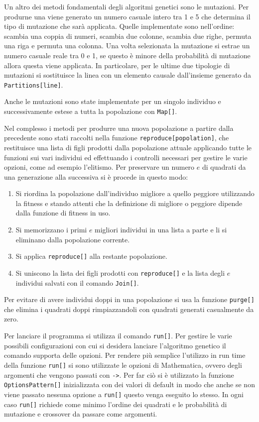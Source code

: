 \documentclass[italian,twoside,twocolumn]{article}
\begin{document}
Un altro dei metodi fondamentali degli algoritmi genetici sono le mutazioni. Per produrne una viene generato un numero casuale intero tra 1 e 5 che determina il tipo di mutazione che sarà applicata. Quelle implementate sono nell'ordine: scambia una coppia di numeri, scambia due colonne, scambia due righe, permuta una riga e permuta una colonna. Una volta selezionata la mutazione si estrae un numero casuale reale tra 0 e 1, se questo è minore della probabilità di mutazione allora questa viene applicata. In particolare, per le ultime due tipologie di mutazioni si sostituisce la linea con un elemento causale dall'insieme generato da \texttt{Partitions[line]}.

Anche le mutazioni sono state implementate per un singolo individuo e successivamente estese a tutta la popolazione con \texttt{Map[]}.

Nel complesso i metodi per produrre una nuova popolazione a partire dalla precedente sono stati raccolti nella funzione \texttt{reproduce[popolation]}, che restituisce una lista di figli prodotti dalla popolazione attuale applicando tutte le funzioni sui vari individui ed effettuando i controlli necessari per gestire le varie opzioni, come ad esempio l'elitismo. Per preservare un numero $ e $ di quadrati da una generazione alla successiva si è procede in questo modo:
\begin{enumerate}
	\item Si riordina la popolazione dall'individuo migliore a quello peggiore utilizzando la fitness e stando attenti che la definizione di migliore o peggiore dipende dalla funzione di fitness in uso.
	\item Si memorizzano i primi $ e $ migliori individui in una lista a parte e li si eliminano dalla popolazione corrente.
	\item Si applica \texttt{reproduce[]} alla restante popolazione.
	\item Si uniscono la lista dei figli prodotti con \texttt{reproduce[]} e la lista degli $ e $ individui salvati con il comando \texttt{Join[]}.
\end{enumerate}
Per evitare di avere individui doppi in una popolazione si usa la funzione \texttt{purge[]} che elimina i quadrati doppi rimpiazzandoli con quadrati generati casualmente da zero.

Per lanciare il programma si utilizza il comando \texttt{run[]}. Per gestire le varie possibili configurazioni con cui si desidera lanciare l'algoritmo genetico il comando supporta delle opzioni. Per rendere più semplice l'utilizzo in run time della funzione \texttt{run[]} si sono utilizzate le opzioni di Mathematica, ovvero degli argomenti che vengono passati con \texttt{->}. Per far ciò si è utilizzato la funzione \texttt{OptionsPattern[]} inizializzata con dei valori di default in modo che anche se non viene passato nessuna opzione a \texttt{run[]} questo venga eseguito lo stesso. In ogni caso \texttt{run[]} richiede come minimo l'ordine dei quadrati e le probabilità di mutazione e crossover da passare come argomenti.
\end{document}
